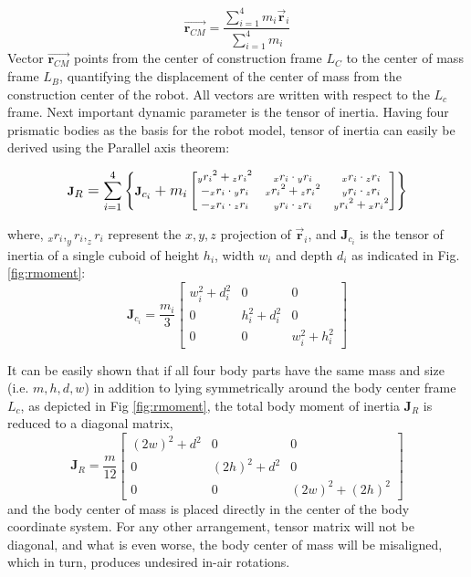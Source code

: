 \begin{equation}\label{eq:CMrobot}
\vec{\textbf{r}_{CM}}=\frac{\sum_{i=1}^{4}m_i\vec{\textbf{r}}_i}{\sum_{i=1}^{4}m_i}
\end{equation}
Vector $\vec{\textbf{r}_{CM}}$ points from the center of construction frame $L_C$ to the center of mass frame $L_B$, quantifying the displacement of the center of mass from the construction center of the robot. All vectors are written with respect to the $L_c$ frame. Next important dynamic parameter is the tensor of inertia. Having four prismatic bodies as the basis for the robot model, tensor of inertia can easily be derived using the Parallel axis theorem:

\begin{equation}
\footnotesize
\textbf{J}_R=\sum_{i=1}^{4}\left \{\textbf{J}_{c_i}+m_i\begin{bmatrix}
{_yr_i}^2+{_zr_i}^2 & {_xr_i}\cdot {_yr_i} & {_xr_i}\cdot {_zr_i} \\ 
-{_xr_i}\cdot {_yr_i} & {_xr_i}^2+{_zr_i}^2 & {_yr_i}\cdot {_zr_i}\\ 
-{_xr_i}\cdot {_zr_i} & {_yr_i}\cdot {_zr_i} & {_yr_i}^2+{_xr_i}^2
\end{bmatrix} \right \}
\normalsize
\end{equation}

where, $_xr_i, _yr_i, _zr_i$ represent the $x,y,z$ projection of $\vec{\textbf{r}}_i$, and $\textbf{J}_{c_i}$ is the tensor of inertia of a single cuboid of height $h_i$, width $w_i$ and depth $d_i$ as indicated in Fig. \ref{fig:rmoment}:
\begin{equation}
\textbf{J}_{c_i}=\frac{m_i}{3}\begin{bmatrix}
w_i^2+d_i^2 &0&0 \\ 
0 &h_i^2+d_i^2&0\\ 
0 &0& w_i^2+h_i^2
\end{bmatrix}
\end{equation} 

It can be easily shown that if all four body parts have the same mass and size (i.e. $m,h,d,w$) in addition to lying symmetrically around the body center frame $L_c$, as depicted in Fig \ref{fig:rmoment}, the total body moment of inertia $\textbf{J}_R$ is reduced to a diagonal matrix,
\begin{equation}
\textbf{J}_{R}=\frac{m}{12}\begin{bmatrix}
(2w)^2+d^2 &0&0 \\ 
0 &(2h)^2+d^2&0\\ 
0 &0& (2w)^2+(2h)^2
\end{bmatrix}
\end{equation} 
and the body center of mass is placed directly in the center of the body coordinate system. For any other arrangement, tensor matrix will not be diagonal, and what is even worse, the body center of mass will be misaligned, which in turn, produces undesired in-air rotations.

